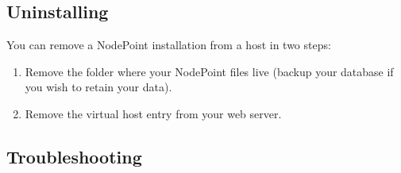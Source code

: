 \documentclass[11pt]{article}
\begin{document}
\subsection{Uninstalling}
You can remove a NodePoint installation from a host in two steps:
\begin{enumerate}
\item Remove the folder where your NodePoint files live (backup your database if you wish to retain your data).
\item Remove the virtual host entry from your web server.
\end{enumerate}

\subsection{Troubleshooting}
\end{document}
